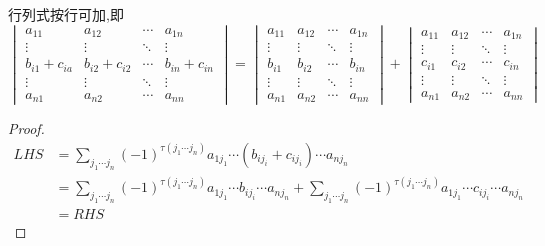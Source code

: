 \documentclass{ctexart}
\begin{document}
\begin{theorem}
    行列式按行可加,即
    \[\begin{vmatrix}
        a_{11}&a_{12}&\cdots&a_{1n}\\
        \vdots&\vdots&\ddots&\vdots\\
        b_{i1}+c_{ia}&b_{i2}+c_{i2}&\cdots&b_{in}+c_{in}\\
        \vdots&\vdots&\ddots&\vdots\\
        a_{n1}&a_{n2}&\cdots&a_{nn}
    \end{vmatrix}=
    \begin{vmatrix}
        a_{11}&a_{12}&\cdots&a_{1n}\\
        \vdots&\vdots&\ddots&\vdots\\
        b_{i1}&b_{i2}&\cdots&b_{in}\\
        \vdots&\vdots&\ddots&\vdots\\
        a_{n1}&a_{n2}&\cdots&a_{nn}
    \end{vmatrix}+
    \begin{vmatrix}
        a_{11}&a_{12}&\cdots&a_{1n}\\
        \vdots&\vdots&\ddots&\vdots\\
        c_{i1}&c_{i2}&\cdots&c_{in}\\
        \vdots&\vdots&\ddots&\vdots\\
        a_{n1}&a_{n2}&\cdots&a_{nn}
    \end{vmatrix}\]
\end{theorem}
\begin{proof}
    \[\begin{aligned}
        LHS
        &=\sum_{j_1\cdots j_n}(-1)^{\tau\left(j_1\cdots j_n\right)}a_{1j_1}\cdots (b_{ij_i}+c_{ij_i})\cdots a_{nj_n}\\
        &=\sum_{j_1\cdots j_n}(-1)^{\tau\left(j_1\cdots j_n\right)}a_{1j_1}\cdots b_{ij_i}\cdots a_{nj_n}+\sum_{j_1\cdots j_n}(-1)^{\tau\left(j_1\cdots j_n\right)}a_{1j_1}\cdots c_{ij_i}\cdots a_{nj_n}\\
        &=RHS
    \end{aligned}\]
\end{proof}
\end{document}
